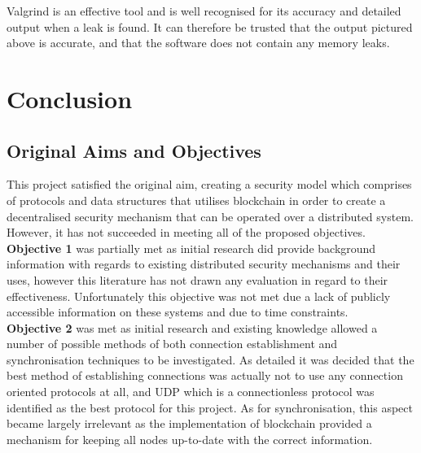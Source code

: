 \documentclass[a4paper, 11pt]{report}
\begin{document}
Valgrind is an effective tool and is well recognised for its accuracy and detailed output when a leak is found. It can therefore be trusted that the output pictured above is accurate, and that the software does not contain any memory leaks.

\chapter{Conclusion}


\section{Original Aims and Objectives}
This project satisfied the original aim, creating a security model which comprises of protocols and data structures that utilises \gls{blockchain} in order to create a decentralised security mechanism that can be operated over a distributed system. However, it has not succeeded in meeting all of the proposed objectives.\\


\textbf{Objective 1} was partially met as initial research did provide background information with regards to existing distributed security mechanisms and their uses, however this literature has not drawn any evaluation in regard to their effectiveness. Unfortunately this objective was not met due a lack of publicly accessible information on these systems and due to time constraints.\\

\textbf{Objective 2} was met as initial research and existing knowledge allowed a number of possible methods of both connection establishment and synchronisation techniques to be investigated. As detailed it was decided that the best method of establishing connections was actually not to use any connection oriented protocols at all, and \acrshort{UDP} which is a connectionless protocol was identified as the best protocol for this project. As for synchronisation, this aspect became largely irrelevant as the implementation of \gls{blockchain} provided a mechanism for keeping all nodes up-to-date with the correct information.\\
\end{document}
